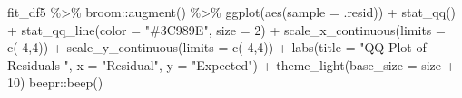 \documentclass[
  english,
  man,floatsintext]{apa6}
\newenvironment{Shaded}{\begin{snugshade}}{\end{snugshade}}
\newcommand{\AttributeTok}[1]{\textcolor[rgb]{0.77,0.63,0.00}{#1}}
\newcommand{\DecValTok}[1]{\textcolor[rgb]{0.00,0.00,0.81}{#1}}
\newcommand{\FunctionTok}[1]{\textcolor[rgb]{0.00,0.00,0.00}{#1}}
\newcommand{\NormalTok}[1]{#1}
\newcommand{\SpecialCharTok}[1]{\textcolor[rgb]{0.00,0.00,0.00}{#1}}
\newcommand{\StringTok}[1]{\textcolor[rgb]{0.31,0.60,0.02}{#1}}
\begin{document}
\begin{Shaded}
\begin{Highlighting}[]
\NormalTok{fit\_df5 }\SpecialCharTok{\%\textgreater{}\%} 
\NormalTok{  broom}\SpecialCharTok{::}\FunctionTok{augment}\NormalTok{() }\SpecialCharTok{\%\textgreater{}\%} 
  \FunctionTok{ggplot}\NormalTok{(}\FunctionTok{aes}\NormalTok{(}\AttributeTok{sample =}\NormalTok{ .resid)) }\SpecialCharTok{+} 
  \FunctionTok{stat\_qq}\NormalTok{() }\SpecialCharTok{+}
  \FunctionTok{stat\_qq\_line}\NormalTok{(}\AttributeTok{color =} \StringTok{"\#3C989E"}\NormalTok{, }\AttributeTok{size =} \DecValTok{2}\NormalTok{) }\SpecialCharTok{+} 
\FunctionTok{scale\_x\_continuous}\NormalTok{(}\AttributeTok{limits =} \FunctionTok{c}\NormalTok{(}\SpecialCharTok{{-}}\DecValTok{4}\NormalTok{,}\DecValTok{4}\NormalTok{)) }\SpecialCharTok{+} 
\FunctionTok{scale\_y\_continuous}\NormalTok{(}\AttributeTok{limits =} \FunctionTok{c}\NormalTok{(}\SpecialCharTok{{-}}\DecValTok{4}\NormalTok{,}\DecValTok{4}\NormalTok{)) }\SpecialCharTok{+} 
  \FunctionTok{labs}\NormalTok{(}\AttributeTok{title =} \StringTok{"QQ Plot of Residuals "}\NormalTok{, }\AttributeTok{x =} \StringTok{"Residual"}\NormalTok{, }\AttributeTok{y =} \StringTok{"Expected"}\NormalTok{) }\SpecialCharTok{+} 
  \FunctionTok{theme\_light}\NormalTok{(}\AttributeTok{base\_size =}\NormalTok{ size }\SpecialCharTok{+} \DecValTok{10}\NormalTok{)}
\NormalTok{beepr}\SpecialCharTok{::}\FunctionTok{beep}\NormalTok{()}
\end{Highlighting}
\end{Shaded}
\end{document}
